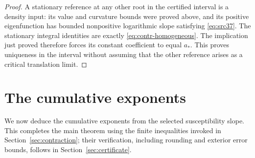 \documentclass[11pt,a4paper]{article}
\numberwithin{equation}{section}
\theoremstyle{definition}
\theoremstyle{remark}
\begin{document}
\begin{proof}
A stationary reference at any other root in the certified interval
is a density input: its value and curvature bounds were proved above,
and its positive eigenfunction has bounded nonpositive logarithmic
slope satisfying \eqref{eq:src37}.  The stationary integral identities
are exactly \eqref{eq:contr-homogeneous}.  The implication just proved
therefore forces its constant coefficient to equal $a_*$.  This proves
uniqueness in the interval without assuming that the other reference
arises as a critical translation limit.
\end{proof}


\section{The cumulative exponents}\label{sec:conclusion}

We now deduce the cumulative exponents from the selected susceptibility
slope. This completes the main theorem using the finite inequalities
invoked in Section~\ref{sec:contraction}; their verification, including
rounding and exterior error bounds, follows in Section~\ref{sec:certificate}.
\end{document}
